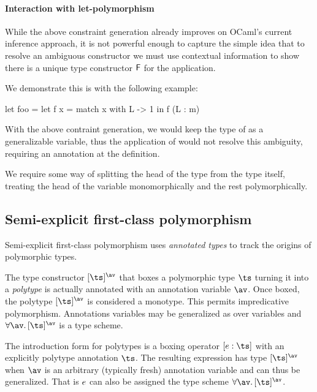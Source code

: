 \documentclass[acmsmall,screen,nonacm]{acmart}
\begin{document}
\paragraph{Interaction with let-polymorphism}


While the above constraint generation already improves on
OCaml's current inference approach, it is not powerful enough to capture the
simple idea that to resolve an ambiguous constructor we must use contextual
information to show there is a unique type constructor $\mathsf{F}$ for the
application.

We demonstrate this is with the following example:
\begin{program}
let foo =
  let f x = match x with L -> 1 in
  f (L : m)
\end{program}
With the above contraint generation, we would keep the type of 
as a generalizable variable, thus the application of  would not
resolve this ambiguity, requiring an annotation at the definition.

We require some way of splitting the head of the type from the type itself,
treating the head of the variable monomorphically and the rest
polymorphically.


\subsection{Semi-explicit first-class polymorphism}


Semi-explicit first-class polymorphism \citep{Garrigue-Remy/poly-ml} uses
\textit{annotated types} to track the origins of polymorphic types.

The type constructor $\tpoly \ts \av$ that boxes a polymorphic type
$\ts$ turning it into a \textit{polytype} is actually annotated with
an annotation variable $\av$.  Once boxed, the polytype $\tpoly
\ts \av$ is considered a monotype.  This permits impredicative
polymorphism. Annotations variables may be generalized as over
variables and $\all \av \tpoly \ts \av$ is a type scheme.

The introduction form for polytypes is a boxing operator $\epoly
\e \ts$ with an explicitly polytype annotation $\ts$. The resulting expression
has type $\tpoly \ts \av$ when $\av$ is an arbitrary (typically fresh)
annotation variable and can thus be generalized. That is $e$ can also be
assigned the type scheme $\all \av \tpoly \ts \av$.
\end{document}
